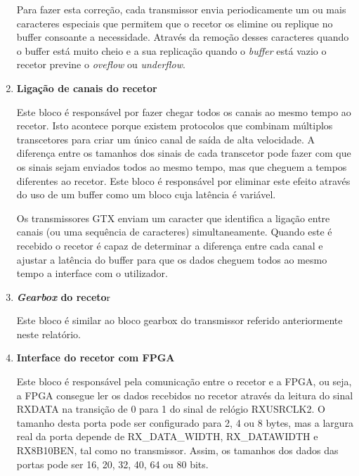 \begin{enumerate}
	\hspace{1.0em}Para fazer esta correção, cada transmissor envia periodicamente um ou mais caracteres especiais que permitem que o recetor os elimine ou replique no buffer consoante a necessidade. Através da remoção desses caracteres quando o buffer está muito cheio e a sua replicação quando o \textit{buffer} está vazio o recetor previne o \textit{oveflow} ou \textit{underflow}. 
	
	\item \textbf{\textbf{Ligação de canais do recetor}}
	
	\hspace{1.0em}Este bloco é responsável por fazer chegar todos os canais ao mesmo tempo ao recetor. Isto acontece porque existem protocolos que combinam múltiplos transcetores para criar um único canal de saída de alta velocidade. A diferença entre os tamanhos dos sinais de cada transcetor pode fazer com que os sinais sejam enviados todos ao mesmo tempo, mas que cheguem a tempos diferentes ao recetor. Este bloco é responsável por eliminar este efeito através do uso de um buffer como um bloco cuja latência é variável. 
	
	\hspace{1.0em}Os transmissores GTX enviam um caracter que identifica a ligação entre canais (ou uma sequência de caracteres) simultaneamente. Quando este é recebido o recetor é capaz de determinar a diferença entre cada canal e ajustar a latência do buffer para que os dados cheguem todos ao mesmo tempo a interface com o utilizador. 
	
	\item \textbf{\textit{Gearbox} do receto}r
	
	\hspace{1.0em}Este bloco é similar ao bloco gearbox do transmissor referido anteriormente neste relatório.
	
	\item \textbf{Interface do recetor com FPGA}
	
	\hspace{1.0em}Este bloco é responsável pela comunicação entre o recetor e a FPGA, ou seja, a FPGA consegue ler os dados recebidos no recetor através da leitura do sinal RXDATA na transição de 0 para 1 do sinal de relógio RXUSRCLK2. O tamanho desta porta pode ser configurado para 2, 4 ou 8 bytes, mas a largura real da porta depende de RX\_DATA\_WIDTH, RX\_DATAWIDTH e RX8B10BEN, tal como no transmissor. Assim, os tamanhos dos dados das portas pode ser 16, 20, 32, 40, 64 ou 80 bits.
	

\end{enumerate}
